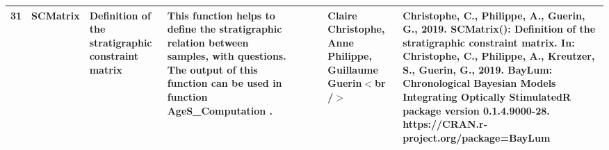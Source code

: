\begin{table}[ht]
\begin{tabular}{rllllllll}
 \\ 
  31 & SCMatrix & Definition of the stratigraphic constraint matrix & This function helps to define the stratigraphic relation between samples, with questions. The output of this function can be used in function  AgeS\_Computation . &  &  &  & Claire Christophe, Anne Philippe, Guillaume Guerin$<$br /$>$ & Christophe, C., Philippe, A., Guerin, G., 2019. SCMatrix(): Definition of the stratigraphic constraint matrix. In: Christophe, C., Philippe, A., Kreutzer, S., Guerin, G., 2019. BayLum: Chronological Bayesian Models Integrating Optically StimulatedR package version 0.1.4.9000-28. https://CRAN.r-project.org/package=BayLum
 \\ 
   \hline
\end{tabular}
\end{table}

